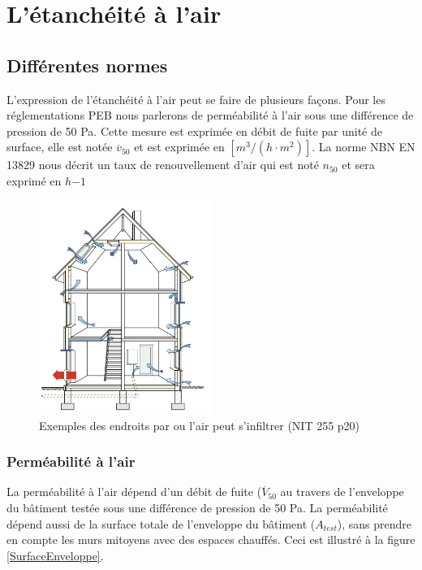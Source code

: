
\chapter{L'étanchéité à l'air}

\ifpdf
    \graphicspath{{Chapter2/Figs/Raster/}{Chapter2/Figs/PDF/}{Chapter2/Figs/}}
\else
    \graphicspath{{Chapter2/Figs/Vector/}{Chapter2/Figs/}}
\fi


\section{Différentes normes}

L'expression de l'étanchéité à l'air peut se faire de plusieurs façons. Pour les réglementations PEB nous parlerons de perméabilité à l'air sous une différence de pression de 50 Pa. Cette mesure est exprimée en débit de fuite par unité de surface, elle est notée $\stackrel{.}{v}_{50}$ et est exprimée en $[m^3/(h\cdot m^2)]$.
La norme NBN EN 13829 nous décrit un taux de renouvellement d'air qui est noté $n_{50}$ et sera exprimé en $h{-1}$

\begin{figure}[ht]
\centering
\includegraphics[width=0.5\textwidth]{Airpaths}
\caption{\label{Airpath} Exemples des endroits par ou l'air peut s'infiltrer (NIT 255 p20)}
\end{figure}


\subsection{Perméabilité à l'air}
La perméabilité à l'air dépend d'un débit de fuite ($\stackrel{.}{V}_{50}$ au travers de l'enveloppe du bâtiment testée sous une différence de pression de 50 Pa. La perméabilité dépend aussi de la surface totale de l'enveloppe du bâtiment ($A_{test}$), sans prendre en compte les murs mitoyens avec des espaces chauffés. Ceci est illustré à la figure \ref{SurfaceEnveloppe}.

